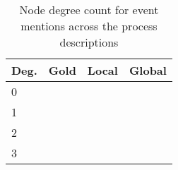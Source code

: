 \begin{table}[t]
{\small
\hfill{}
\begin{tabular}{|l|r|r|r|}
\hline
\textbf{Deg.} &\textbf{Gold}&\textbf{Local} & \textbf{Global}\\
\hline
0            &            &           &   \\ 
1            &            &           &   \\ 
2                &           &          &    \\ 
3          &            &              & \\ 
\hline
\end{tabular}}
\hfill{}
\caption{Node degree count for event mentions across the process descriptions}
\label{tab:degree}
\end{table}





















